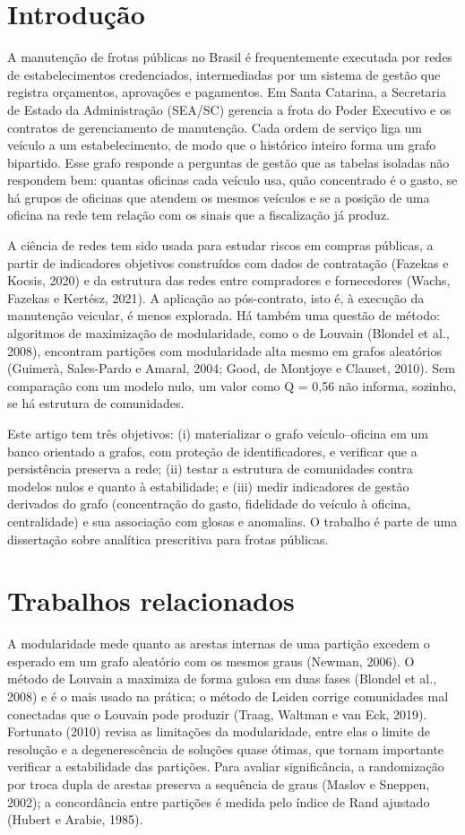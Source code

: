 \documentclass[12pt,a4paper]{article}
\begin{document}
\section{Introdução}
A manutenção de frotas públicas no Brasil é frequentemente executada por redes de estabelecimentos credenciados, intermediadas por um sistema de gestão que registra orçamentos, aprovações e pagamentos. Em Santa Catarina, a Secretaria de Estado da Administração (SEA/SC) gerencia a frota do Poder Executivo e os contratos de gerenciamento de manutenção. Cada ordem de serviço liga um veículo a um estabelecimento, de modo que o histórico inteiro forma um grafo bipartido. Esse grafo responde a perguntas de gestão que as tabelas isoladas não respondem bem: quantas oficinas cada veículo usa, quão concentrado é o gasto, se há grupos de oficinas que atendem os mesmos veículos e se a posição de uma oficina na rede tem relação com os sinais que a fiscalização já produz.

A ciência de redes tem sido usada para estudar riscos em compras públicas, a partir de indicadores objetivos construídos com dados de contratação (Fazekas e Kocsis, 2020) e da estrutura das redes entre compradores e fornecedores (Wachs, Fazekas e Kertész, 2021). A aplicação ao pós-contrato, isto é, à execução da manutenção veicular, é menos explorada. Há também uma questão de método: algoritmos de maximização de modularidade, como o de Louvain (Blondel et al., 2008), encontram partições com modularidade alta mesmo em grafos aleatórios (Guimerà, Sales-Pardo e Amaral, 2004; Good, de Montjoye e Clauset, 2010). Sem comparação com um modelo nulo, um valor como Q = 0,56 não informa, sozinho, se há estrutura de comunidades.

Este artigo tem três objetivos: (i) materializar o grafo veículo–oficina em um banco orientado a grafos, com proteção de identificadores, e verificar que a persistência preserva a rede; (ii) testar a estrutura de comunidades contra modelos nulos e quanto à estabilidade; e (iii) medir indicadores de gestão derivados do grafo (concentração do gasto, fidelidade do veículo à oficina, centralidade) e sua associação com glosas e anomalias. O trabalho é parte de uma dissertação sobre analítica prescritiva para frotas públicas.

\section{Trabalhos relacionados}
A modularidade mede quanto as arestas internas de uma partição excedem o esperado em um grafo aleatório com os mesmos graus (Newman, 2006). O método de Louvain a maximiza de forma gulosa em duas fases (Blondel et al., 2008) e é o mais usado na prática; o método de Leiden corrige comunidades mal conectadas que o Louvain pode produzir (Traag, Waltman e van Eck, 2019). Fortunato (2010) revisa as limitações da modularidade, entre elas o limite de resolução e a degenerescência de soluções quase ótimas, que tornam importante verificar a estabilidade das partições. Para avaliar significância, a randomização por troca dupla de arestas preserva a sequência de graus (Maslov e Sneppen, 2002); a concordância entre partições é medida pelo índice de Rand ajustado (Hubert e Arabie, 1985).
\end{document}
